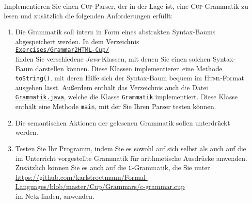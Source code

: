 \exercise
Implementieren Sie einen \textsc{Cup}-Parser, der in der Lage ist, eine
\textsc{Cup}-Grammatik zu lesen und zus\"atzlich die folgenden Anforderungen erf\"ullt:
\begin{enumerate}
\item Die Grammatik soll intern in Form eines abstrakten Syntax-Baums abgespeichert werden.  
      In dem Verzeichnis 
      \\[0.2cm]
      \hspace*{1.3cm}
\href{https://github.com/karlstroetmann/Formal-Languages/tree/master/Exercises/Grammar2HTML-Cup/}{
\texttt{Exercises/Grammar2HTML-Cup/}}
      \\[0.2cm]
      finden Sie verschiedene \textsl{Java}-Klassen, mit denen Sie einen solchen Syntax-Baum
      darstellen k\"onnen.  Diese Klassen implementieren eine Methode \texttt{toString()}, mit deren
      Hilfe sich der Syntax-Baum bequem im \textsc{Html}-Format ausgeben l\"asst.  Au{\ss}erdem enth\"alt
      das Verzeichnis auch die Datei 
      \href{https://github.com/karlstroetmann/Formal-Languages/tree/master/Exercises/Grammar2HTML-Cup/Grammatik.java}{\texttt{Grammatik.java}},
      welche die Klasse \texttt{Grammatik}
      implementiert.  Diese Klasse enth\"alt eine Methode \texttt{main}, mit der Sie Ihren Parser
      testen k\"onnen.
\item Die semantischen Aktionen der gelesenen Grammatik sollen unterdr\"uckt werden.
\item Testen Sie Ihr Programm, indem Sie es sowohl auf sich selbst als auch auf die im Unterricht
      vorgestellte Grammatik f\"ur arithmetische Ausdr\"ucke anwenden.
      Zus\"atzlich k\"onnen Sie es auch auf die \texttt{C}-Grammatik, die Sie unter
      \\[0.2cm]
      \hspace*{1.3cm}
      \href{https://github.com/karlstroetmann/Formal-Languages/blob/master/Cup/Grammars/c-grammar.cup}{https://github.com/karlstroetmann/Formal-Languages/blob/master/Cup/Grammars/c-grammar.cup}
      \\[0.2cm]
      im Netz finden, anwenden.
\end{enumerate}


